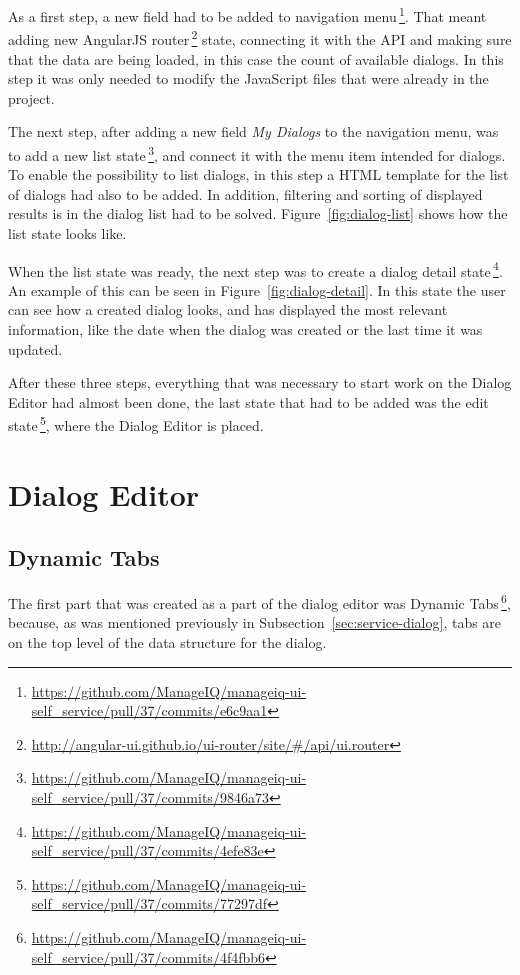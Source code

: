 As a first step, a new field had to be added to navigation
menu\,\footnote{\url{https://github.com/ManageIQ/manageiq-ui-self_service/pull/37/commits/e6c9aa1}}.
That meant adding new AngularJS
router\,\footnote{\url{http://angular-ui.github.io/ui-router/site/\#/api/ui.router}}
state, connecting it with the API and making sure that the
data are being loaded, in this case the count of available dialogs.
In this step it was only needed to modify the JavaScript files that were
already in the project.

The next step, after adding a new field {\it My Dialogs} to the navigation
menu, was to add a new list
state\,\footnote{\url{https://github.com/ManageIQ/manageiq-ui-self_service/pull/37/commits/9846a73}},
and connect it with the menu item intended for dialogs.
To enable the possibility to list dialogs, in this step a HTML
template for the list of dialogs had also to be added.
In addition, filtering and sorting of displayed results is in the dialog
list had to be solved. Figure~\ref{fig:dialog-list} shows how the list state
looks like.

When the list state was ready, the next step was to create a dialog detail
state\,\footnote{\url{https://github.com/ManageIQ/manageiq-ui-self_service/pull/37/commits/4efe83e}}.
An example of this can be seen in Figure~\ref{fig:dialog-detail}.
In this state the user can see how a created dialog looks, and has displayed
the most relevant information, like the date when the dialog was created or the
last time it was updated.

After these three steps, everything that was necessary to start work on the
Dialog Editor had almost been done, the last state that had to be added was the
edit state\,\footnote{\url{https://github.com/ManageIQ/manageiq-ui-self_service/pull/37/commits/77297df}},
where the Dialog Editor is placed.

\section{Dialog Editor}

\subsection{Dynamic Tabs}
The first part that was created as a part of the dialog editor was
Dynamic Tabs\,\footnote{\url{https://github.com/ManageIQ/manageiq-ui-self_service/pull/37/commits/4f4fbb6}},
because, as was mentioned previously in Subsection~\ref{sec:service-dialog},
tabs are on the top level of the data structure for the dialog.

